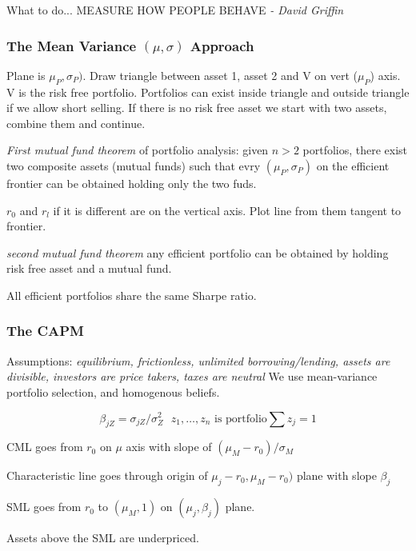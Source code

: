 \documentclass[a4paper,12pt]{article}
\begin{document}
\begin{multicols}{2}
\begin{description}
\end{description}

What to do... MEASURE HOW PEOPLE BEHAVE \emph{ - David Griffin}

\subsubsection*{The Mean Variance $(\mu,\sigma)$ Approach}
Plane is $\mu_P,\sigma_P)$. Draw triangle between asset 1, asset 2 and V on
vert ($\mu_P$) axis. V is the risk free portfolio. Portfolios can exist inside
triangle and outside triangle if we allow short selling. If there is no risk
free asset we start with two assets, combine them and continue.

\emph{First mutual fund theorem} of portfolio analysis: given $n>2$ portfolios,
there exist two composite assets (mutual funds) such that evry
$(\mu_P,\sigma_P)$ on the efficient frontier can be obtained holding only the
two fuds.

$r_0$ and $r_l$ if it is different are on the vertical axis. Plot line from
them tangent to frontier.

\emph{second mutual fund theorem} any efficient portfolio can be obtained by
holding risk free asset and a mutual fund.

All efficient portfolios share the same Sharpe ratio.

\subsubsection*{The CAPM}
Assumptions: \emph{equilibrium, frictionless, unlimited borrowing/lending,
assets are divisible, investors are price takers, taxes are neutral} We use
mean-variance portfolio selection, and homogenous beliefs.

\[\beta_{jZ}=\sigma_{jZ}/\sigma^2_Z\mbox{ \ }z_1,\ldots,z_n \mbox{ is
portfolio} \sum z_j=1\]

CML goes from $r_0$ on $\mu$ axis with slope of $(\mu_M-r_0)/\sigma_M$

Characteristic line goes through origin of $\mu_j-r_0,\mu_M-r_0)$ plane with
slope $\beta_j$

SML goes from $r_0$ to $(\mu_M,1)$ on $(\mu_j,\beta_j)$ plane.

Assets above the SML are underpriced.
\end{multicols}
\end{document}
